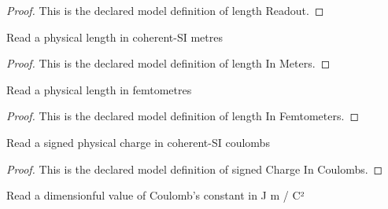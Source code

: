 \begin{proof}
  This is the declared model definition of length Readout.
\end{proof}
\begin{definition}
  \label{def:physics:phyx-mini-0636:phyxminiproblems-problemphyxmini0636-lengthinmeters}
  Read a physical length in coherent-SI metres
\end{definition}
\begin{proof}
  This is the declared model definition of length In Meters.
\end{proof}
\begin{definition}
  \label{def:physics:phyx-mini-0636:phyxminiproblems-problemphyxmini0636-lengthinfemtometers}
  Read a physical length in femtometres
\end{definition}
\begin{proof}
  This is the declared model definition of length In Femtometers.
\end{proof}
\begin{definition}
  \label{def:physics:phyx-mini-0636:phyxminiproblems-problemphyxmini0636-signedchargeincoulombs}
  Read a signed physical charge in coherent-SI coulombs
\end{definition}
\begin{proof}
  This is the declared model definition of signed Charge In Coulombs.
\end{proof}
\begin{definition}
  \label{def:physics:phyx-mini-0636:phyxminiproblems-problemphyxmini0636-coulombconstantinjoulemeterspercoulombsquared}
  Read a dimensionful value of Coulomb's constant in J m / C²
\end{definition}
